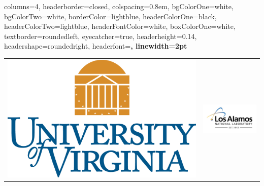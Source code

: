 \documentclass[landscape,paperwidth=70in,paperheight=46in,fontscale=0.225]{baposter} %
\begin{document}
\begin{poster}
{
columns=4,  %
headerborder=closed, %
colspacing=0.8em, %
bgColorOne=white, %
bgColorTwo=white, %
borderColor=lightblue, %
headerColorOne=black, %
headerColorTwo=lightblue, %
headerFontColor=white, %
boxColorOne=white, %
textborder=roundedleft, %
eyecatcher=true, %
headerheight=0.14\textheight, %
headershape=roundedright, %
headerfont=\Large\bf\textsc, %
linewidth=2pt %
}
%
{ 
\begin{tabular}{c c}
\includegraphics[scale=0.2]{logos/uva_logo.png} & \includegraphics[scale=0.4]{logos/losA.png} \\

\end{tabular}}
\end{poster}
\end{document}
